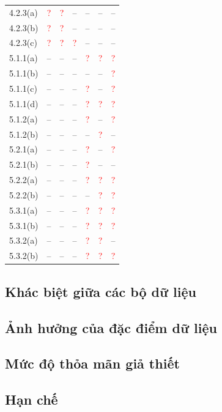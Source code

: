 \begin{longtable}{@{}lcccccc@{}}
4.2.3(a) & \textcolor{red}{?} & \textcolor{red}{?} & -- & -- & -- & -- \\
4.2.3(b) & \textcolor{red}{?} & \textcolor{red}{?} & -- & -- & -- & -- \\
4.2.3(c) & \textcolor{red}{?} & \textcolor{red}{?} & \textcolor{red}{?} & -- & -- & -- \\
5.1.1(a) & -- & -- & -- & \textcolor{red}{?} & \textcolor{red}{?} & \textcolor{red}{?} \\
5.1.1(b) & -- & -- & -- & -- & -- & \textcolor{red}{?} \\
5.1.1(c) & -- & -- & -- & \textcolor{red}{?} & -- & \textcolor{red}{?} \\
5.1.1(d) & -- & -- & -- & \textcolor{red}{?} & \textcolor{red}{?} & \textcolor{red}{?} \\
5.1.2(a) & -- & -- & -- & \textcolor{red}{?} & -- & \textcolor{red}{?} \\
5.1.2(b) & -- & -- & -- & -- & \textcolor{red}{?} & -- \\
5.2.1(a) & -- & -- & -- & \textcolor{red}{?} & -- & \textcolor{red}{?} \\
5.2.1(b) & -- & -- & -- & \textcolor{red}{?} & -- & -- \\
5.2.2(a) & -- & -- & -- & \textcolor{red}{?} & \textcolor{red}{?} & \textcolor{red}{?} \\
5.2.2(b) & -- & -- & -- & -- & \textcolor{red}{?} & \textcolor{red}{?} \\
5.3.1(a) & -- & -- & -- & \textcolor{red}{?} & \textcolor{red}{?} & \textcolor{red}{?} \\
5.3.1(b) & -- & -- & -- & \textcolor{red}{?} & \textcolor{red}{?} & \textcolor{red}{?} \\
5.3.2(a) & -- & -- & -- & \textcolor{red}{?} & \textcolor{red}{?} & -- \\
5.3.2(b) & -- & -- & -- & \textcolor{red}{?} & \textcolor{red}{?} & \textcolor{red}{?} \\
\end{longtable}

\subsection{Khác biệt giữa các bộ dữ liệu}

\subsection{Ảnh hưởng của đặc điểm dữ liệu}

\subsection{Mức độ thỏa mãn giả thiết}

\subsection{Hạn chế}
